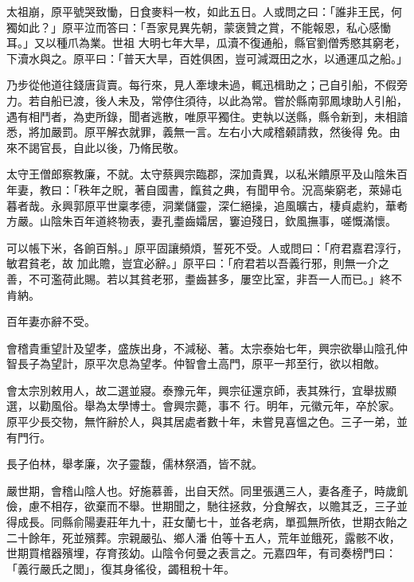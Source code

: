 \begin{pinyinscope}
 太祖崩，原平號哭致慟，日食麥料一枚，如此五日。人或問之曰：「誰非王民，何獨如此？」原平泣而答曰：「吾家見異先朝，蒙褒贊之賞，不能報恩，私心感慟耳。」又以種爪為業。世祖
 大明七年大旱，瓜瀆不復通船，縣官劉僧秀愍其窮老，下瀆水與之。原平曰：「普天大旱，百姓俱困，豈可減溉田之水，以通運瓜之船。」



 乃步從他道往錢唐貨賣。每行來，見人牽埭未過，輒迅楫助之；己自引船，不假旁力。若自船已渡，後人未及，常停住須待，以此為常。嘗於縣南郭鳳埭助人引船，遇有相鬥者，為吏所錄，聞者逃散，唯原平獨住。吏執以送縣，縣令新到，未相諳悉，將加嚴罰。原平解衣就罪，義無一言。左右小大咸稽顙請救，然後得
 免。由來不謁官長，自此以後，乃脩民敬。



 太守王僧郎察教廉，不就。太守蔡興宗臨郡，深加貴異，以私米饋原平及山陰朱百年妻，教曰：「秩年之貺，著自國書，餼貧之典，有聞甲令。況高柴窮老，萊婦屯暮者哉。永興郭原平世稟孝德，洞業儲靈，深仁絕操，追風曠古，棲貞處約，華耇方嚴。山陰朱百年道終物表，妻孔耋齒孀居，窶迫殘日，欽風撫事，嗟慨滿懷。



 可以帳下米，各餉百斛。」原平固讓頻煩，誓死不受。人或問曰：「府君嘉君淳行，敏君貧老，故
 加此贍，豈宜必辭。」原平曰：「府君若以吾義行邪，則無一介之善，不可濫荷此賜。若以其貧老邪，耋齒甚多，屢空比室，非吾一人而已。」終不肯納。



 百年妻亦辭不受。



 會稽貴重望計及望孝，盛族出身，不減秘、著。太宗泰始七年，興宗欲舉山陰孔仲智長子為望計，原平次息為望孝。仲智會土高門，原平一邦至行，欲以相敵。



 會太宗別敕用人，故二選並寢。泰豫元年，興宗征還京師，表其殊行，宜舉拔顯選，以勸風俗。舉為太學博士。會興宗薨，事不
 行。明年，元徽元年，卒於家。原平少長交物，無忤辭於人，與其居處者數十年，未嘗見喜慍之色。三子一弟，並有門行。



 長子伯林，舉孝廉，次子靈馥，儒林祭酒，皆不就。



 嚴世期，會稽山陰人也。好施慕善，出自天然。同里張邁三人，妻各產子，時歲飢儉，慮不相存，欲棄而不舉。世期聞之，馳往拯救，分食解衣，以贍其乏，三子並得成長。同縣俞陽妻莊年九十，莊女蘭七十，並各老病，單孤無所依，世期衣飴之二十餘年，死並殯葬。宗親嚴弘、鄉人潘
 伯等十五人，荒年並餓死，露骸不收，世期買棺器殯埋，存育孩幼。山陰令何曼之表言之。元嘉四年，有司奏榜門曰：「義行嚴氏之閭」，復其身徭役，蠲租稅十年。




\end{pinyinscope}
